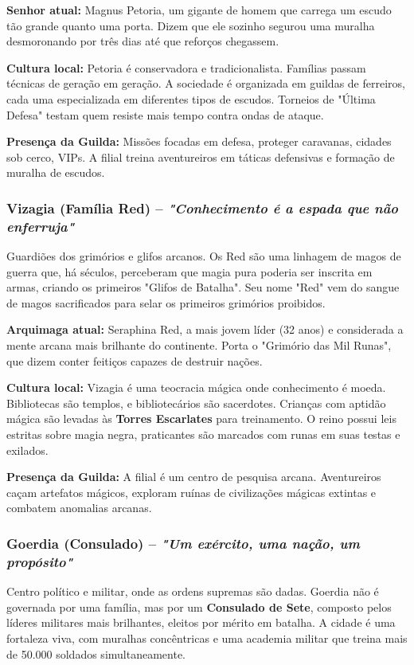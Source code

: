\textbf{\ringmfamily Senhor atual:} Magnus Petoria, um gigante de homem que carrega um escudo tão grande quanto uma porta. Dizem que ele sozinho segurou uma muralha desmoronando por três dias até que reforços chegassem.

\textbf{\ringmfamily Cultura local:} Petoria é conservadora e tradicionalista. Famílias passam técnicas de geração em geração. A sociedade é organizada em guildas de ferreiros, cada uma especializada em diferentes tipos de escudos. Torneios de "Última Defesa" testam quem resiste mais tempo contra ondas de ataque.

\textbf{\ringmfamily Presença da Guilda:} Missões focadas em defesa, proteger caravanas, cidades sob cerco, VIPs. A filial treina aventureiros em táticas defensivas e formação de muralha de escudos.

\subsubsection*{Vizagia (Família Red) – \textit{"Conhecimento é a espada que não enferruja"}}
Guardiões dos grimórios e glifos arcanos. Os Red são uma linhagem de magos de guerra que, há séculos, perceberam que magia pura poderia ser inscrita em armas, criando os primeiros "Glifos de Batalha". Seu nome "Red" vem do sangue de magos sacrificados para selar os primeiros grimórios proibidos.

\textbf{\ringmfamily Arquimaga atual:} Seraphina Red, a mais jovem líder (32 anos) e considerada a mente arcana mais brilhante do continente. Porta o "Grimório das Mil Runas", que dizem conter feitiços capazes de destruir nações.

\textbf{\ringmfamily Cultura local:} Vizagia é uma teocracia mágica onde conhecimento é moeda. Bibliotecas são templos, e bibliotecários são sacerdotes. Crianças com aptidão mágica são levadas às \textbf{Torres Escarlates} para treinamento. O reino possui leis estritas sobre magia negra, praticantes são marcados com runas em suas testas e exilados.

\textbf{\ringmfamily Presença da Guilda:} A filial é um centro de pesquisa arcana. Aventureiros caçam artefatos mágicos, exploram ruínas de civilizações mágicas extintas e combatem anomalias arcanas.

\subsubsection*{Goerdia (Consulado) – \textit{"Um exército, uma nação, um propósito"}}
Centro político e militar, onde as ordens supremas são dadas. Goerdia não é governada por uma família, mas por um \textbf{Consulado de Sete}, composto pelos líderes militares mais brilhantes, eleitos por mérito em batalha. A cidade é uma fortaleza viva, com muralhas concêntricas e uma academia militar que treina mais de 50.000 soldados simultaneamente.

